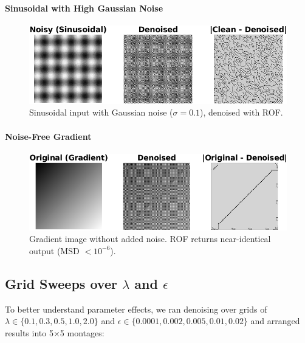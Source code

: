 \documentclass[11pt]{article}
\begin{document}
\paragraph{Sinusoidal with High Gaussian Noise}
\begin{figure}[h!]
\centering
\includegraphics[width=\textwidth]{../utils/results/test_images/high_noise_sinusoidal.png}
\caption{Sinusoidal input with Gaussian noise (\(\sigma=0.1\)), denoised with ROF.}
\end{figure}

\paragraph{Noise-Free Gradient}
\begin{figure}[h!]
\centering
\includegraphics[width=\textwidth]{../utils/results/test_images/zero_noise_gradient.png}
\caption{Gradient image without added noise. ROF returns near-identical output (MSD \(< 10^{-6}\)).}
\end{figure}

\subsection*{Grid Sweeps over \(\lambda\) and \(\epsilon\)}

To better understand parameter effects, we ran denoising over grids of \(\lambda \in \{0.1, 0.3, 0.5, 1.0, 2.0\}\) and \(\epsilon \in \{0.0001, 0.002, 0.005, 0.01, 0.02\}\) and arranged results into 5×5 montages:
\end{document}
